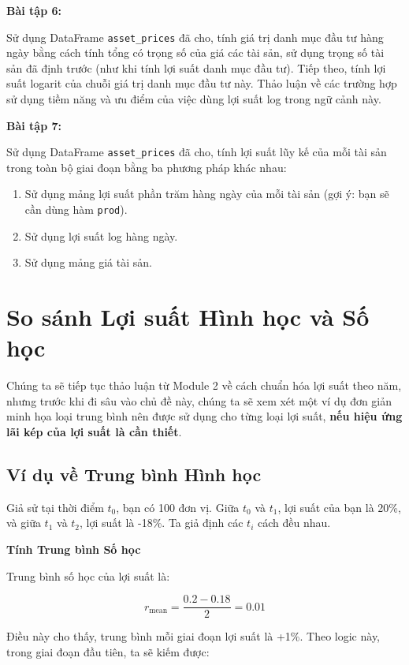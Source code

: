 \textbf{Bài tập 6:}

Sử dụng DataFrame \texttt{asset\_prices} đã cho, tính giá trị danh mục đầu tư hàng ngày bằng cách tính tổng có trọng số của giá các tài sản, sử dụng trọng số tài sản đã định trước (như khi tính lợi suất danh mục đầu tư). Tiếp theo, tính lợi suất logarit của chuỗi giá trị danh mục đầu tư này. Thảo luận về các trường hợp sử dụng tiềm năng và ưu điểm của việc dùng lợi suất log trong ngữ cảnh này.

\textbf{Bài tập 7:}

Sử dụng DataFrame \texttt{asset\_prices} đã cho, tính lợi suất lũy kế của mỗi tài sản trong toàn bộ giai đoạn bằng ba phương pháp khác nhau:

\begin{enumerate}
  \item Sử dụng mảng lợi suất phần trăm hàng ngày của mỗi tài sản (gợi ý: bạn sẽ cần dùng hàm \texttt{prod}).
  \item Sử dụng lợi suất log hàng ngày.
  \item Sử dụng mảng giá tài sản.
\end{enumerate}

\section{So sánh Lợi suất Hình học và Số học}

Chúng ta sẽ tiếp tục thảo luận từ Module 2 về cách chuẩn hóa lợi suất theo năm, nhưng trước khi đi sâu vào chủ đề này, chúng ta sẽ xem xét một ví dụ đơn giản minh họa loại trung bình nên được sử dụng cho từng loại lợi suất, \textbf{nếu hiệu ứng lãi kép của lợi suất là cần thiết}.

\subsection{Ví dụ về Trung bình Hình học}

Giả sử tại thời điểm $t_{0}$, bạn có 100 đơn vị. Giữa $t_{0}$ và $t_{1}$, lợi suất của bạn là 20\%, và giữa $t_{1}$ và $t_{2}$, lợi suất là -18\%. Ta giả định các $t_{i}$ cách đều nhau.

\textbf{Tính Trung bình Số học}

Trung bình số học của lợi suất là:

$$
r_{\text{mean}} = \frac{0.2 - 0.18}{2} = 0.01
$$

Điều này cho thấy, trung bình mỗi giai đoạn lợi suất là +1\%. Theo logic này, trong giai đoạn đầu tiên, ta sẽ kiếm được:

